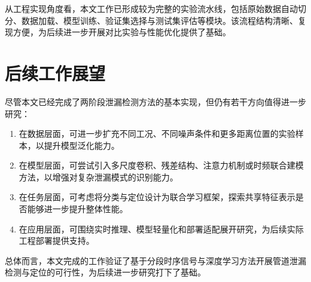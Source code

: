 从工程实现角度看，本文工作已形成较为完整的实验流水线，包括原始数据自动切分、数据加载、模型训练、验证集选择与测试集评估等模块。该流程结构清晰、复现方便，为后续进一步开展对比实验与性能优化提供了基础。

\section{后续工作展望}

尽管本文已经完成了两阶段泄漏检测方法的基本实现，但仍有若干方向值得进一步研究：

\begin{enumerate}
  \item 在数据层面，可进一步扩充不同工况、不同噪声条件和更多距离位置的实验样本，以提升模型泛化能力。
  \item 在模型层面，可尝试引入多尺度卷积、残差结构、注意力机制或时频联合建模方法，以增强对复杂泄漏模式的识别能力。
  \item 在任务层面，可考虑将分类与定位设计为联合学习框架，探索共享特征表示是否能够进一步提升整体性能。
  \item 在应用层面，可围绕实时推理、模型轻量化和部署适配展开研究，为后续实际工程部署提供支持。
\end{enumerate}

总体而言，本文完成的工作验证了基于分段时序信号与深度学习方法开展管道泄漏检测与定位的可行性，为后续进一步研究打下了基础。
